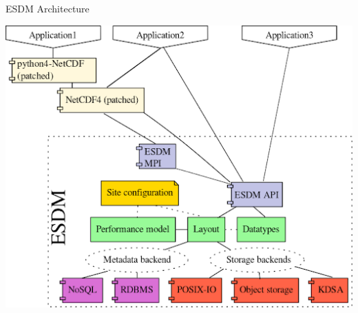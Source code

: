 \documentclass[compress,11pt,xcolor=svgnames,aspectratio=169]{beamer}
\begin{document}
\begin{frame}[fragile]{ESDM Architecture}

\begin{center}
\includegraphics[scale=0.6]{fig/esdm2}
\end{center}

\end{frame}

\begin{frame}[fragile]{}

\begin{center}
\end{center}

\end{frame}
\end{document}
